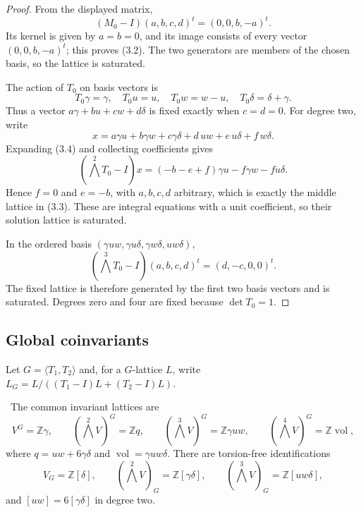 \begin{proof}
From the displayed matrix,
\[
(M_0-I)(a,b,c,d)^t=(0,0,b,-a)^t.
\]
Its kernel is given by $a=b=0$, and its image consists of every vector
$(0,0,b,-a)^t$; this proves (3.2).  The two generators are members of the
chosen basis, so the lattice is saturated.

The action of $T_0$ on basis vectors is
\[
T_0\gamma=\gamma,\quad T_0u=u,\quad
T_0w=w-u,\quad T_0\delta=\delta+\gamma.
\tag{3.4}
\]
Thus a vector $a\gamma+bu+cw+d\delta$ is fixed exactly when $c=d=0$.
For degree two, write
\[
x=a\gamma u+b\gamma w+c\gamma\delta
  +d\,uw+e\,u\delta+f\,w\delta.
\]
Expanding (3.4) and collecting coefficients gives
\[
(\textstyle\bigwedge^2T_0-I)x
=(-b-e+f)\gamma u-f\gamma w-fu\delta .
\]
Hence $f=0$ and $e=-b$, with $a,b,c,d$ arbitrary, which is exactly the
middle lattice in (3.3).  These are integral equations with a unit
coefficient, so their solution lattice is saturated.

In the ordered basis
$(\gamma uw,\gamma u\delta,\gamma w\delta,uw\delta)$,
\[
(\textstyle\bigwedge^3T_0-I)(a,b,c,d)^t
=(d,-c,0,0)^t.
\]
The fixed lattice is therefore generated by the first two basis vectors and
is saturated.  Degrees zero and four are fixed because $\det T_0=1$.
\end{proof}

\subsection{Global coinvariants}

Let $G=\langle T_1,T_2\rangle$ and, for a $G$-lattice $L$, write
$L_G=L/((T_1-I)L+(T_2-I)L)$.

\begin{theorem}\label{thm:coinvariants}
\Verified\ The common invariant lattices are
\[
 V^G=\mathbb Z\gamma,\qquad
 (\textstyle\bigwedge^2V)^G=\mathbb Zq,\qquad
 (\textstyle\bigwedge^3V)^G=\mathbb Z\gamma uw,\qquad
 (\textstyle\bigwedge^4V)^G=\mathbb Z\operatorname{vol},
\]
where $q=uw+6\gamma\delta$ and
$\operatorname{vol}=\gamma uw\delta$.  There are torsion-free
identifications
\[
V_G=\mathbb Z[\delta],\qquad
(\textstyle\bigwedge^2V)_G=\mathbb Z[\gamma\delta],
\qquad
(\textstyle\bigwedge^3V)_G=\mathbb Z[uw\delta],
\tag{3.5}
\]
and $[uw]=6[\gamma\delta]$ in degree two.
\end{theorem}

